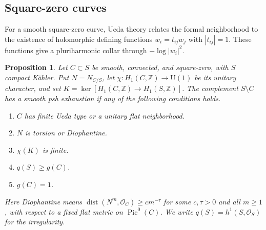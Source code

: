 \documentclass[11pt]{amsart}
\newtheorem{proposition}[theorem]{Proposition}
\theoremstyle{definition}
\theoremstyle{remark}
\numberwithin{equation}{section}
\newcommand{\OO}{\mathcal O}
\newcommand{\Uone}{\mathrm U(1)}
\begin{document}
\begin{samepage}
\subsection{Square-zero curves}\label{subsec:smooth-boundary}
For a smooth square-zero curve, Ueda theory relates the formal
neighborhood to the existence of holomorphic defining functions
$w_i=t_{ij}w_j$ with $|t_{ij}|=1$. These functions give a
pluriharmonic collar through $-\log|w_i|^2$.

\begin{proposition}\label{prop:surface-ueda-sufficient}
Let $C\subset S$ be smooth, connected, and square-zero, with $S$
compact K\"ahler. Put $N=N_{C/S}$, let
$\chi:H_1(C,\mathbb Z)\to\Uone$ be its unitary character, and set
$K=\ker[H_1(C,\mathbb Z)\to H_1(S,\mathbb Z)]$.
The complement $S\setminus C$ has a smooth psh exhaustion if any of
the following conditions holds.
\begin{enumerate}[label=\textup{(\roman*)},leftmargin=2.5em]
\item $C$ has finite Ueda type or a unitary flat neighborhood.
\item $N$ is torsion or Diophantine.
\item $\chi(K)$ is finite.
\item $q(S)\ge g(C)$.
\item $g(C)=1$.
\end{enumerate}
Here Diophantine means
$\operatorname{dist}(N^m,\OO_C)\ge c m^{-\tau}$ for some
$c,\tau>0$ and all $m\ge1$, with respect to a fixed flat metric on
$\operatorname{Pic}^0(C)$. We write
$q(S)=h^1(S,\OO_S)$ for the irregularity.
\end{proposition}
\end{samepage}
\end{document}

